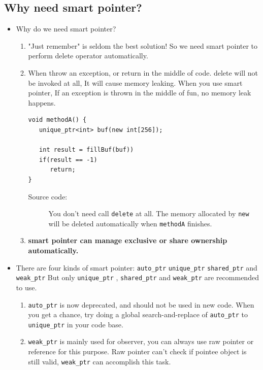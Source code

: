 \documentclass[a4paper,11pt,twoside]{book}
\begin{document}
\subsection{Why need smart pointer?}
\begin{itemize}


\item Why do we need smart pointer?
\begin{enumerate}
\item "Just remember" is seldom the best solution! So we need smart pointer to perform delete operator automatically.

\item When throw an exception, or return in the middle of code. delete will not be invoked at all, It will cause memory leaking. When you use smart pointer, If an exception is thrown in the middle of fun, no memory leak happens.
\begin{lstlisting}[numbers=none]
void methodA() {
   unique_ptr<int> buf(new int[256]);

   int result = fillBuf(buf))
   if(result == -1)
      return;
}
\end{lstlisting}
\begin{description}
	\item[Source code:] You don't need call \texttt{delete} at all. The memory allocated by \texttt{new} will be deleted automatically when \texttt{methodA} finishes.
\end{description}

\item \textbf{smart pointer can manage exclusive or share ownership automatically. }
\end{enumerate}

\item There are four kinds of smart pointer: \texttt{auto\_ptr} \texttt{unique\_ptr} \texttt{shared\_ptr} and \texttt{weak\_ptr}  But only \texttt{unique\_ptr} , \texttt{shared\_ptr} and \texttt{weak\_ptr} are recommended to use.
\begin{enumerate}
	\item  \texttt{auto\_ptr} is now deprecated, and should not be used in new code. When you get a chance, try doing a global search-and-replace of \texttt{auto\_ptr} to \texttt{unique\_ptr} in your code base. 
	
	\item \texttt{weak\_ptr} is mainly used for observer, you can always use raw pointer or reference for this purpose. Raw pointer can't check if pointee object is still valid, \texttt{weak\_ptr} can accomplish this task.
\end{enumerate}


\end{itemize}
\end{document}
